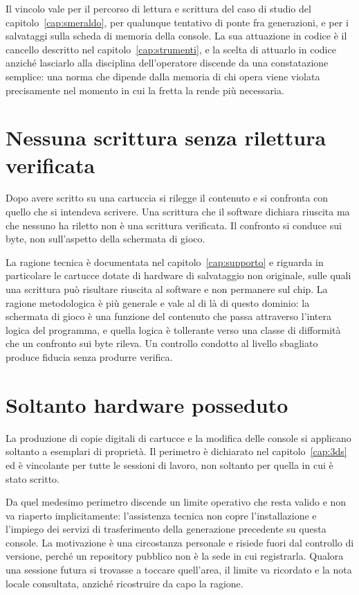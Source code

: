 Il vincolo vale per il percorso di lettura e scrittura del caso di studio del capitolo~\ref{cap:smeraldo}, per qualunque tentativo di ponte fra generazioni, e per i salvataggi sulla scheda di memoria della console. La sua attuazione in codice è il cancello descritto nel capitolo~\ref{cap:strumenti}, e la scelta di attuarlo in codice anziché lasciarlo alla disciplina dell'operatore discende da una constatazione semplice: una norma che dipende dalla memoria di chi opera viene violata precisamente nel momento in cui la fretta la rende più necessaria.

\section{Nessuna scrittura senza rilettura verificata}

Dopo avere scritto su una cartuccia si rilegge il contenuto e si confronta con quello che si intendeva scrivere. Una scrittura che il software dichiara riuscita ma che nessuno ha riletto non è una scrittura verificata. Il confronto si conduce sui byte, non sull'aspetto della schermata di gioco.

La ragione tecnica è documentata nel capitolo~\ref{cap:supporto} e riguarda in particolare le cartucce dotate di hardware di salvataggio non originale, sulle quali una scrittura può risultare riuscita al software e non permanere sul chip. La ragione metodologica è più generale e vale al di là di questo dominio: la schermata di gioco è una funzione del contenuto che passa attraverso l'intera logica del programma, e quella logica è tollerante verso una classe di difformità che un confronto sui byte rileva. Un controllo condotto al livello sbagliato produce fiducia senza produrre verifica.

\section{Soltanto hardware posseduto}

La produzione di copie digitali di cartucce e la modifica delle console si applicano soltanto a esemplari di proprietà. Il perimetro è dichiarato nel capitolo~\ref{cap:3ds} ed è vincolante per tutte le sessioni di lavoro, non soltanto per quella in cui è stato scritto.

Da quel medesimo perimetro discende un limite operativo che resta valido e non va riaperto implicitamente: l'assistenza tecnica non copre l'installazione e l'impiego dei servizi di trasferimento della generazione precedente su questa console. La motivazione è una circostanza personale e risiede fuori dal controllo di versione, perché un repository pubblico non è la sede in cui registrarla. Qualora una sessione futura si trovasse a toccare quell'area, il limite va ricordato e la nota locale consultata, anziché ricostruire da capo la ragione.

